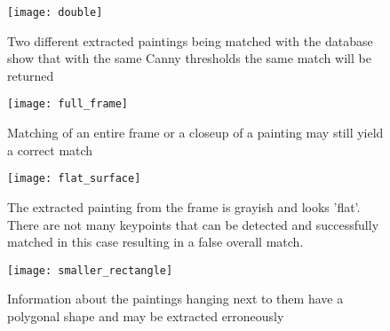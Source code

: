 \begin{figure}
	\texttt{[image: double]}
	\caption{Two different extracted paintings being matched with the database show that with the same Canny thresholds the same match will be returned}
	\label{fig:double}
\end{figure}

\begin{figure}
	\texttt{[image: full\_frame]}
	\caption{Matching of an entire frame or a closeup of a painting may still yield a correct match}
	\label{fig:full_frame}
\end{figure}

\begin{figure}
	\texttt{[image: flat\_surface]}
	\caption{The extracted painting from the frame is grayish and looks 'flat'. There are not many keypoints that can be detected and successfully matched in this case resulting in a false overall match.}
	\label{fig:flat_surface}
\end{figure}

\begin{figure}
	\texttt{[image: smaller\_rectangle]}
	\caption{Information about the paintings hanging next to them have a polygonal shape and may be extracted erroneously}
	\label{fig:smaller_rectangle}
\end{figure}